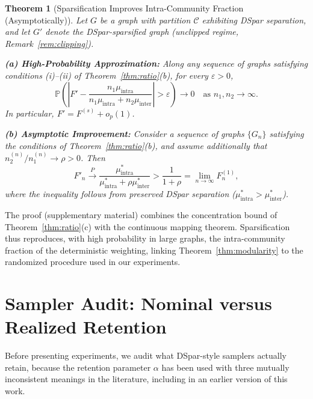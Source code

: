 \documentclass[10pt,journal,compsoc]{IEEEtran}
\newtheorem{theorem}{Theorem}
\begin{document}
\begin{theorem}[Sparsification Improves Intra-Community Fraction (Asymptotically)]
\label{thm:sparsification}
Let $G$ be a graph with partition $\mathcal{C}$ exhibiting DSpar separation, and
let $G'$ denote the DSpar-sparsified graph (unclipped regime, Remark~\ref{rem:clipping}).

\textbf{(a) High-Probability Approximation:}
Along any sequence of graphs satisfying conditions (i)--(ii) of Theorem~\ref{thm:ratio}(b), for every $\varepsilon > 0$,
\begin{equation}
\mathbb{P}\!\left(
\left| F' -
\frac{n_1 \mu_{\text{intra}}}{n_1 \mu_{\text{intra}} + n_2 \mu_{\text{inter}}}
\right| > \varepsilon
\right) \longrightarrow 0 \quad \text{as } n_1, n_2 \to \infty.
\end{equation}
In particular, $F' = F^{(s)} + o_p(1)$.

\textbf{(b) Asymptotic Improvement:}
Consider a sequence of graphs $\{G_n\}$ satisfying the conditions of
Theorem~\ref{thm:ratio}(b), and assume additionally that
$n_2^{(n)}/n_1^{(n)} \to \rho > 0$. Then
\begin{equation}
F'_n \xrightarrow{P}
\frac{\mu_{\text{intra}}^*}{\mu_{\text{intra}}^* + \rho \mu_{\text{inter}}^*}
>
\frac{1}{1+\rho}
= \lim_{n \to \infty} F^{(1)}_n,
\end{equation}
where the inequality follows from preserved DSpar separation
($\mu_{\text{intra}}^* > \mu_{\text{inter}}^*$).
\end{theorem}

\noindent The proof (supplementary material) combines the concentration bound of Theorem~\ref{thm:ratio}(c) with the continuous mapping theorem.
Sparsification thus reproduces, with high probability in large graphs, the intra-community fraction of the deterministic weighting, linking Theorem~\ref{thm:modularity} to the randomized procedure used in our experiments.

\section{Sampler Audit: Nominal versus Realized Retention}
\label{sec:sampler}

Before presenting experiments, we audit what DSpar-style samplers actually retain, because the retention parameter $\alpha$ has been used with three mutually inconsistent meanings in the literature, including in an earlier version of this work.
\end{document}
